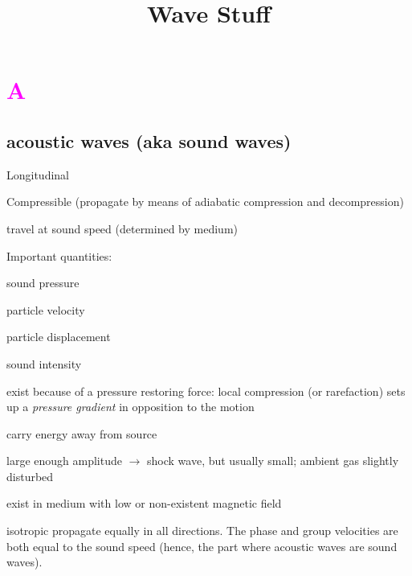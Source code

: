 \documentclass[12pt]{article}
\title{\vspace{-0.5in}Wave Stuff}
\author{}
\date{}
\begin{document}
\maketitle

\vspace{-1in}

\section*{\textcolor{magenta}{A}}

\subsection*{acoustic waves (aka sound waves)}
\begin{itemize*}
    \item Longitudinal
    \item Compressible (propagate by means of adiabatic
        compression and decompression)
    \item travel at sound speed (determined by medium)
    \item Important quantities:
        \begin{itemize*}
            \item sound pressure
            \item particle velocity
            \item particle displacement
            \item sound intensity
        \end{itemize*}
    \item exist because of a pressure restoring force: local compression
        (or rarefaction) sets up a \emph{pressure gradient} in opposition
        to the motion
    \item carry energy away from source
    \item large enough amplitude $\rightarrow$ shock wave,
        but usually small; ambient gas slightly disturbed
    \item exist in medium with low or non-existent magnetic field
    \item isotropic \- propagate equally in all directions. The phase
        and group velocities are both equal to the sound speed (hence, the
        part where acoustic waves are sound waves).
\end{itemize*}
\end{document}
